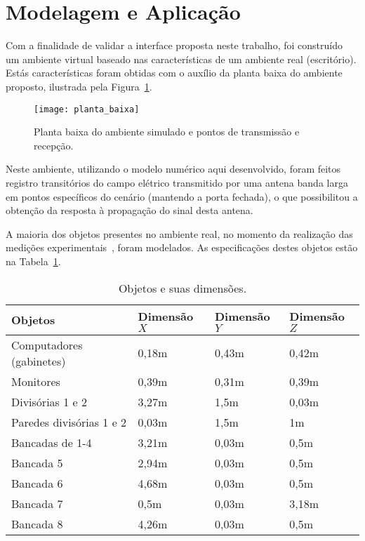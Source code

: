 \section{Modelagem e Aplicação}
	Com a finalidade de validar a interface proposta neste trabalho, foi construído um ambiente virtual baseado nas características de um ambiente real (escritório). Estás características foram obtidas com o auxílio da planta baixa do ambiente proposto, ilustrada pela Figura~\ref{fg:planta_baixa}.

\begin{figure}[!ht]
	\centering
	\texttt{[image: planta\_baixa]}
	\caption{Planta baixa do ambiente simulado e pontos de transmissão e recepção.}
	\label{fg:planta_baixa}
\end{figure}

	Neste ambiente, utilizando o modelo numérico aqui desenvolvido, foram feitos registro transitórios do campo elétrico transmitido por uma antena banda larga em pontos específicos do cenário (mantendo a porta fechada), o que possibilitou a obtenção da resposta à propagação do sinal desta antena.

	A maioria dos objetos presentes no ambiente real, no momento da realização das medições experimentais~\cite{fabricio}, foram modelados. As especificações destes objetos estão na Tabela~\ref{tb:objetos}.

\begin{table}
	\centering
	\caption{Objetos e suas dimensões.}
	\begin{tabular}{|l|l|l|l|}
	\hline
	\textbf{Objetos} & \textbf{Dimensão $X$} & \textbf{Dimensão} $Y$ & \textbf{Dimensão $Z$}\\ \hline
	Computadores (gabinetes) & 0,18m & 0,43m & 0,42m \\ \hline
	Monitores & 0,39m & 0,31m & 0,39m \\ \hline
	Divisórias 1 e 2 & 3,27m & 1,5m & 0,03m \\ \hline
	Paredes divisórias 1 e 2 & 0,03m & 1,5m & 1m \\ \hline
	Bancadas de 1-4 & 3,21m & 0,03m & 0,5m \\ \hline
	Bancada 5 & 2,94m & 0,03m & 0,5m \\ \hline
	Bancada 6 & 4,68m & 0,03m & 0,5m \\ \hline
	Bancada 7 & 0,5m & 0,03m & 3,18m \\ \hline
	Bancada 8 & 4,26m & 0,03m & 0,5m \\
	\hline
	\end{tabular}
	\label{tb:objetos}
\end{table}

